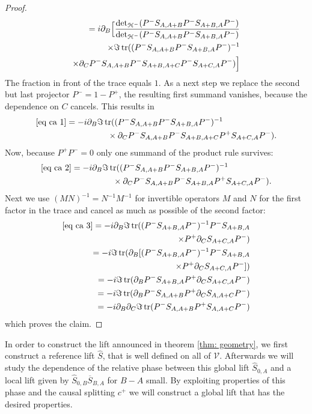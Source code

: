\documentclass[b5paper,draft,openbib,12pt]{memoir}
\DeclareMathOperator{\tr}{tr}
\begin{document}
\begin{proof}
\begin{align}
=i\partial_B \Big[\frac{\det_{\mathcal{H}^-}(P^-S_{A,A+B}P^-S_{A+B,A}P^-)}{\det_{\mathcal{H}^-}(P^-S_{A,A+B}P^-S_{A+B,A}P^-)}\\\notag
\times \Im  \tr ((P^-S_{A,A+B}P^-S_{A+B,A}P^-)^{-1}\\
\times\partial_C P^-S_{A,A+B}P^-S_{A+B,A+C}P^- S_{A+C,A}P^-)\Big]\label{eq ca 1}
\end{align}
The fraction in front of the trace equals \(1\). As a next step we replace the second but last projector \(P^-=1-P^+\), the resulting first summand vanishes,
because the dependence on \(C\) cancels. This results in 
\begin{align}\notag
&\eqref{eq ca 1}=-i\partial_B \Im \tr((P^-S_{A,A+B}P^-S_{A+B,A}P^-)^{-1}\\
&\hspace{3cm}\times\partial_C P^-S_{A,A+B}P^-S_{A+B,A+C}P^+ S_{A+C,A}P^-).\label{eq ca 2}
\end{align}
Now, because \(P^+P^-=0\) only one summand of the product rule survives:
\begin{align}\notag
&\eqref{eq ca 2}=-i\partial_B \Im \tr((P^-S_{A,A+B}P^-S_{A+B,A}P^-)^{-1}\\
&\hspace{3cm}\times\partial_C P^-S_{A,A+B}P^-S_{A+B,A}P^+ S_{A+C,A}P^-).\label{eq ca 3}
\end{align}
Next we use 
\((M N )^{-1}= N^{-1} M^{-1}\) for invertible operators \(M\) and \(N\) for the first factor in the trace and cancel as much as possible of
the second factor:
\begin{align}\notag
\eqref{eq ca 3}=-i\partial_B \Im \tr((P^-S_{A+B,A}P^-)^{-1}  P^-S_{A+B,A}\\
\times P^+ \partial_C S_{A+C,A}P^-)\\\notag
=-i \Im \tr(\partial_B[(P^-S_{A+B,A}P^-)^{-1}  P^-S_{A+B,A}\\
\times P^+ \partial_C S_{A+C,A}P^-])\\
=-i \Im \tr(\partial_B  P^-S_{A+B,A}P^+ \partial_C S_{A+C,A}P^-)\\
=-i \Im \tr(\partial_B  P^-S_{A,A+B}P^+ \partial_C S_{A,A+C}P^-)\\
=-i \partial_B\partial_C\Im \tr(  P^-S_{A,A+B}P^+  S_{A,A+C}P^-)
\end{align}
which proves the claim.

\end{proof}



In order to construct the lift announced in theorem \ref{thm: geometry}, we first construct a reference lift \(\hat{S}\), that is well defined on all of \(\mathcal{V}\). 
Afterwards we will study the dependence of the relative phase between 
this global lift \(\hat{S}_{0,A}\) and a local lift given by \(\hat{S}_{0,B}\overline{S}_{B,A}\) for \(B-A\) small. 
By exploiting properties of this phase and the causal splitting \(c^+\) we will construct a global lift that has the desired properties.
\end{document}

